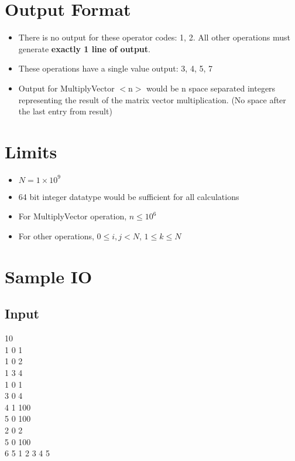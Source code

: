 \documentclass[20pt]{article}
\begin{document}
\section{Output Format}
\begin{itemize}
\item There is no output for these operator codes: 1, 2. All other operations must generate \textbf{exactly 1 line of output}.
\item These operations have a single value output: 3, 4, 5, 7
\item Output for MultiplyVector $<$n$>$ would be n space separated integers representing the result of the matrix vector multiplication. (No space after the last entry from result)
\end{itemize}

\section{Limits}
\begin{itemize}
\item $N = 1 \times 10^9$
\item 64 bit integer datatype would be sufficient for all calculations
\item For MultiplyVector operation, $n\leq 10^6$ 
\item For other operations, $0 \leq i,j < N$, $1 \leq k \leq N$
\end{itemize}


\section{Sample IO}
\subsection{Input}
\hspace{10mm} 10\\
\-\hspace{10mm} 1 0 1\\
\-\hspace{10mm} 1 0 2\\
\-\hspace{10mm} 1 3 4\\
\-\hspace{10mm} 1 0 1\\
\-\hspace{10mm} 3 0 4\\
\-\hspace{10mm} 4 1 100\\
\-\hspace{10mm} 5 0 100\\
\-\hspace{10mm} 2 0 2\\
\-\hspace{10mm} 5 0 100\\
\-\hspace{10mm} 6 5 1 2 3 4 5\\
\end{document}
